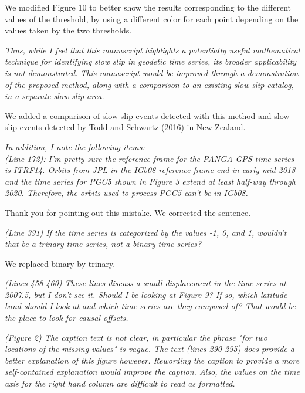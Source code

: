 \documentclass[letterpaper, 12pt]{article}
\begin{document}
\bigskip

We modified Figure 10 to better show the results corresponding to the different values of the threshold, by using a different color for each point depending on the values taken by the two thresholds.

\bigskip

\textit{Thus, while I feel that this manuscript highlights a potentially useful mathematical technique for identifying slow slip in geodetic time series, its broader applicability is not demonstrated. This manuscript would be improved through a demonstration of the proposed method, along with a comparison to an existing slow slip catalog, in a separate slow slip area.}

\bigskip

We added a comparison of slow slip events detected with this method and slow slip events detected by Todd and Schwartz (2016) in New Zealand.

\bigskip

\textit{In addition, I note the following items:} \\

\textit{(Line 172): I'm pretty sure the reference frame for the PANGA GPS time series is ITRF14. Orbits from JPL in the IGb08 reference frame end in early-mid 2018 and the time series for PGC5 shown in Figure 3 extend at least half-way through 2020. Therefore, the orbits used to process PGC5 can't be in IGb08.}

\bigskip

Thank you for pointing out this mistake. We corrected the sentence.

\bigskip

\textit{(Line 391) If the time series is categorized by the values -1, 0, and 1, wouldn't that be a trinary time series, not a binary time series?}

\bigskip

We replaced binary by trinary.

\bigskip

\textit{(Lines 458-460) These lines discuss a small displacement in the time series at 2007.5, but I don't see it. Should I be looking at Figure 9? If so, which latitude band should I look at and which time series are they composed of? That would be the place to look for causal offsets.}

\bigskip

\textit{(Figure 2) The caption text is not clear, in particular the phrase "for two locations of the missing values" is vague. The text (lines 290-295) does provide a better explanation of this figure however. Rewording the caption to provide a more self-contained explanation would improve the caption. Also, the values on the time axis for the right hand column are difficult to read as formatted.}
\end{document}
